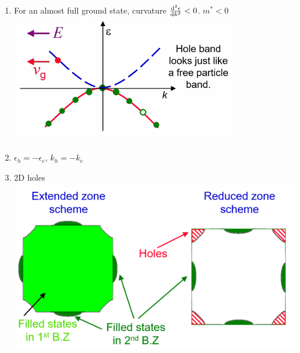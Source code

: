 \documentclass{article}
\theoremstyle{remark}
\theoremstyle{remark}
\begin{document}
\begin{enumerate}
\begin{itemize}
        \end{itemize}
    \item For an almost full ground state, curvature $\dv[2]{\epsilon}{k}<0$. $\boxed{m^*<0}$\newline
        \includegraphics*[width=0.5\linewidth]{cmp_almost_full_ground_state.png}
    \item $\epsilon_h=-\epsilon_e$, $k_h=-k_e$
    \item 2D holes\newline
        \includegraphics*[width=0.5\linewidth]{cmp_holes_2d.png}
\end{enumerate}
\end{document}
